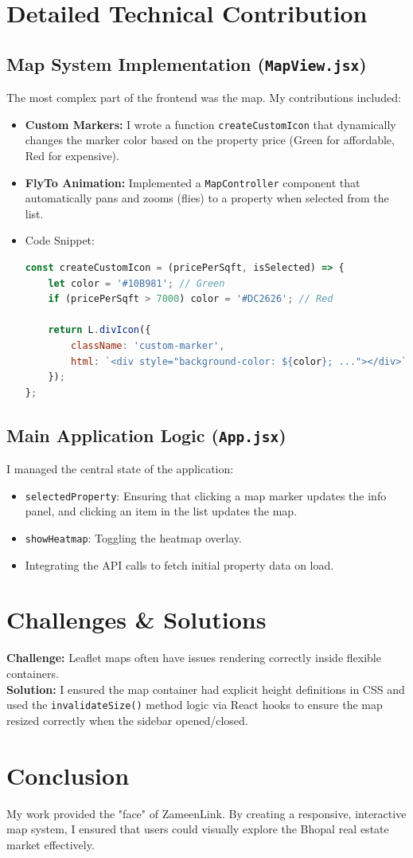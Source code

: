 \documentclass[12pt, a4paper]{article}
\begin{document}
\section{Detailed Technical Contribution}

\subsection{Map System Implementation (\texttt{MapView.jsx})}
The most complex part of the frontend was the map. My contributions included:
\begin{itemize}
    \item \textbf{Custom Markers:} I wrote a function \texttt{createCustomIcon} that dynamically changes the marker color based on the property price (Green for affordable, Red for expensive).
    \item \textbf{FlyTo Animation:} Implemented a \texttt{MapController} component that automatically pans and zooms (flies) to a property when selected from the list.
    \item Code Snippet:
    \begin{lstlisting}[language=JavaScript]
const createCustomIcon = (pricePerSqft, isSelected) => {
    let color = '#10B981'; // Green
    if (pricePerSqft > 7000) color = '#DC2626'; // Red
    
    return L.divIcon({
        className: 'custom-marker',
        html: `<div style="background-color: ${color}; ..."></div>`
    });
};
    \end{lstlisting}
\end{itemize}

\subsection{Main Application Logic (\texttt{App.jsx})}
I managed the central state of the application:
\begin{itemize}
    \item \texttt{selectedProperty}: Ensuring that clicking a map marker updates the info panel, and clicking an item in the list updates the map.
    \item \texttt{showHeatmap}: Toggling the heatmap overlay.
    \item Integrating the API calls to fetch initial property data on load.
\end{itemize}

\section{Challenges \& Solutions}
\textbf{Challenge:} Leaflet maps often have issues rendering correctly inside flexible containers.\\
\textbf{Solution:} I ensured the map container had explicit height definitions in CSS and used the \texttt{invalidateSize()} method logic via React hooks to ensure the map resized correctly when the sidebar opened/closed.

\section{Conclusion}
My work provided the "face" of ZameenLink. By creating a responsive, interactive map system, I ensured that users could visually explore the Bhopal real estate market effectively.
\end{document}
